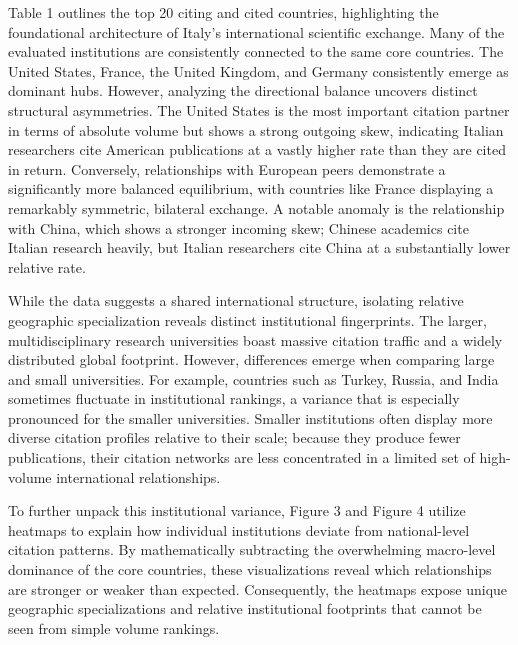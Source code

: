 \documentclass[year=2026]{cup-journal}
\begin{document}
Table 1 outlines the top 20 citing and cited countries, highlighting the foundational architecture of Italy’s international scientific exchange. Many of the evaluated institutions are consistently connected to the same core countries. The United States, France, the United Kingdom, and Germany consistently emerge as dominant hubs. However, analyzing the directional balance uncovers distinct structural asymmetries. The United States is the most important citation partner in terms of absolute volume but shows a strong outgoing skew, indicating Italian researchers cite American publications at a vastly higher rate than they are cited in return. Conversely, relationships with European peers demonstrate a significantly more balanced equilibrium, with countries like France displaying a remarkably symmetric, bilateral exchange. A notable anomaly is the relationship with China, which shows a stronger incoming skew; Chinese academics cite Italian research heavily, but Italian researchers cite China at a substantially lower relative rate.

While the data suggests a shared international structure, isolating relative geographic specialization reveals distinct institutional fingerprints. The larger, multidisciplinary research universities boast massive citation traffic and a widely distributed global footprint. However, differences emerge when comparing large and small universities. For example, countries such as Turkey, Russia, and India sometimes fluctuate in institutional rankings, a variance that is especially pronounced for the smaller universities. Smaller institutions often display more diverse citation profiles relative to their scale; because they produce fewer publications, their citation networks are less concentrated in a limited set of high-volume international relationships.

To further unpack this institutional variance, Figure 3 and Figure 4 utilize heatmaps to explain how individual institutions deviate from national-level citation patterns. By mathematically subtracting the overwhelming macro-level dominance of the core countries, these visualizations reveal which relationships are stronger or weaker than expected. Consequently, the heatmaps expose unique geographic specializations and relative institutional footprints that cannot be seen from simple volume rankings.
\end{document}
